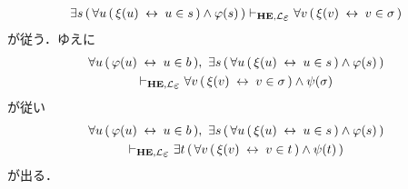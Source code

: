\begin{metaprf}
\begin{description}
\begin{description}
\begin{align}
							\exists s\, (\, \forall u\, (\, \xi(u) \lrarrow u \in s\, ) \wedge \varphi(s)\, ) 
							\provable{\mbox{{\bf HE}},\lang{\varepsilon}} \forall v\, (\, \xi(v) \lrarrow v \in \sigma\, )
						\end{align}
						が従う．ゆえに
						\begin{align}
							\begin{gathered}
								\forall u\, (\, \varphi(u) \lrarrow u \in b\, ),\ 
								\exists s\, (\, \forall u\, (\, \xi(u) \lrarrow u \in s\, ) \wedge \varphi(s)\, ) \\
								\provable{\mbox{{\bf HE}},\lang{\varepsilon}} \forall v\, (\, \xi(v) \lrarrow v \in \sigma\, ) \wedge \psi(\sigma)
							\end{gathered}
						\end{align}
						が従い
						\begin{align}
							\begin{gathered}
								\forall u\, (\, \varphi(u) \lrarrow u \in b\, ),\ 
								\exists s\, (\, \forall u\, (\, \xi(u) \lrarrow u \in s\, ) \wedge \varphi(s)\, ) \\
								\provable{\mbox{{\bf HE}},\lang{\varepsilon}} \exists t\, (\, \forall v\, (\, \xi(v) \lrarrow v \in t\, ) \wedge \psi(t)\, )
							\end{gathered}
						\end{align}
						が出る．
						\QED
				\end{description}
		\end{description}
	\end{metaprf}